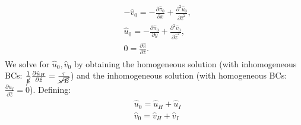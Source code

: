 \documentclass{article}
\newcommand{\pd}[2]{\frac{\partial{#1}}{\partial{#2}}}
\newcommand{\pdd}[2]{\frac{\partial^2{#1}}{\partial{#2}^2}}
\begin{document}
\begin{align}\label{eq:bl-order-1}
 \begin{split}
  & -\hat{v}_{0} = -\pd{\hat{\pi}_{0} }{x} + \pdd{\hat{u}_{0}}{\hat{z} },\\
  &\hat{u}_{0} = -\pd{\hat{\pi}_{0} }{y} + \pdd{\hat{v}_{0}}{\hat{z} },\\
  & 0 = \pd{\hat{\pi}}{\hat{z} }.
 \end{split}
\end{align}
We solve for $\hat{u}_{0}, \hat{v}_{0}$ by obtaining the homogeneous solution (with inhomogeneous BCs: $\frac{1}{\cancel{h} }\pd{\hat{u}_{H}}{\hat{z}} = \frac{\tau}{\cancel{\sqrt{E} }}$) and the inhomogeneous solution (with homogeneous BCs: $\pd{\hat{u}_{I}}{\hat{z}} = 0$). Defining:
\begin{align}
 \begin{split}
  &\hat{u}_{0} = \hat{u}_{H} + \hat{u}_{I}\\
  &\hat{v}_{0} = \hat{v}_{H} + \hat{v}_{I}\\
 \end{split}
\end{align}
%
\end{document}
